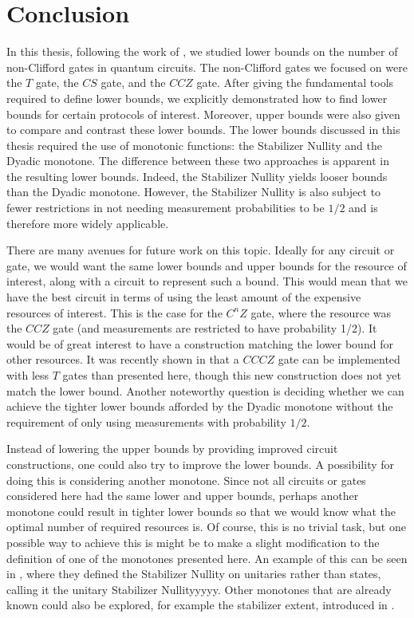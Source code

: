 \documentclass[12pt]{dalthesis}
\begin{document}
\chapter{Conclusion}
\label{Conclusion}
In this thesis, following the work of \cite{beverland2019lower}, we studied lower bounds on the number of non-Clifford gates in quantum circuits. The non-Clifford gates we focused on were the $T$ gate, the $CS$ gate, and the $CCZ$ gate. After giving the fundamental tools required to define lower bounds, we explicitly demonstrated how to find lower bounds for certain protocols of interest. Moreover, upper bounds were also given to compare and contrast these lower bounds. The lower bounds discussed in this thesis required the use of monotonic functions: the Stabilizer Nullity and the Dyadic monotone.  The difference between these two approaches is apparent in the resulting lower bounds. Indeed, the Stabilizer Nullity yields looser  bounds than the Dyadic monotone. However, the Stabilizer Nullity is also subject to fewer restrictions in not needing measurement probabilities to be $1/2$ and is therefore more widely applicable.

There are many avenues for future work on this topic. Ideally for any circuit or gate, we would want the same lower bounds and upper bounds for the resource of interest, along with a circuit to represent such a bound. This would mean that we have the best circuit in terms of using the least amount of the expensive resources of interest. This is the case for the $C^nZ$ gate, where the resource was the $CCZ$ gate (and measurements are restricted to have probability 1/2). It would be of great interest to have a construction matching the lower bound for other resources. It was recently shown in \cite{gidney2021cccz} that a $CCCZ$ gate can be implemented with less $T$ gates than presented here, though this new construction does not yet match the lower bound. Another noteworthy question is deciding whether we can achieve the tighter lower bounds afforded by the Dyadic monotone without the requirement of only using measurements with probability $1/2$.

Instead of lowering the upper bounds by providing improved circuit constructions, one could also try to improve the lower bounds. A possibility for doing this is considering another monotone. Since not all circuits or gates considered here had the same lower and upper bounds, perhaps another monotone could result in tighter lower bounds so that we would know what the optimal number of required resources is. Of course, this is no trivial task, but one possible way to achieve this is might be to make a slight modification to the definition of one of the monotones presented here. An example of this can be seen in \cite{jiang2021lower}, where they defined the Stabilizer Nullity on unitaries rather than states, calling it the unitary Stabilizer Nullityyyyy. Other monotones that are already known could also be explored, for example the stabilizer extent, introduced in \cite{beverland2019lower}.



\end{document}
